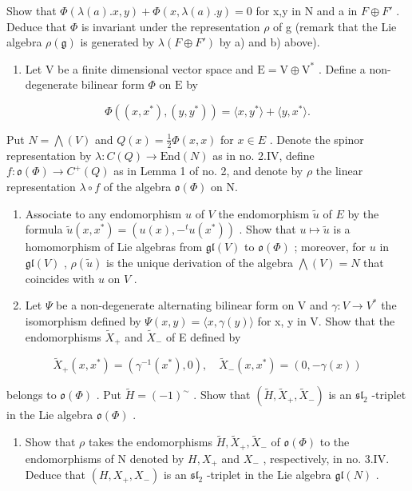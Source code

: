Show that \(\Phi(\lambda(a).x,y)+\Phi(x,\lambda(a).y)=0\) for x,y in N and a in \(F\oplus F'\) . Deduce that \(\Phi\) is invariant under the representation \(\rho\) of g (remark that the Lie algebra \(\rho(\mathfrak{g})\) is generated by \(\lambda(F\oplus F')\) by a) and b) above).

\begin{enumerate}
\def\labelenumi{\arabic{enumi})}
\setcounter{enumi}{18}
\tightlist
\item
  Let \(\mathrm{V}\) be a finite dimensional vector space and \(\mathrm{E} = \mathrm{V} \oplus \mathrm{V}^*\) . Define a non-degenerate bilinear form \(\varPhi\) on \(\mathrm{E}\) by
\end{enumerate}

\[
\Phi ((x, x ^ {*}), (y, y ^ {*})) = \langle x, y ^ {*} \rangle + \langle y, x ^ {*} \rangle .
\]

Put \(N = \bigwedge(V)\) and \(Q(x) = \frac{1}{2}\Phi(x, x)\) for \(x \in E\) . Denote the spinor representation by \(\lambda : C(Q) \to \text{End}(N)\) as in no. 2.IV, define \(f : \mathfrak{o}(\Phi) \to C^{+}(Q)\) as in Lemma 1 of no. 2, and denote by \(\rho\) the linear representation \(\lambda \circ f\) of the algebra \(\mathfrak{o}(\Phi)\) on N.

\begin{enumerate}
\def\labelenumi{\alph{enumi})}
\item
  Associate to any endomorphism \(u\) of \(V\) the endomorphism \(\tilde{u}\) of \(E\) by the formula \(\tilde{u}(x, x^{*}) = (u(x), -^{t}u(x^{*}))\) . Show that \(u \mapsto \tilde{u}\) is a homomorphism of Lie algebras from \(\mathfrak{gl}(V)\) to \(\mathfrak{o}(\varPhi)\) ; moreover, for \(u\) in \(\mathfrak{gl}(V)\) , \(\rho(\tilde{u})\) is the unique derivation of the algebra \(\bigwedge(V) = N\) that coincides with \(u\) on \(V\) .
\item
  Let \(\varPsi\) be a non-degenerate alternating bilinear form on V and \(\gamma: V \to V^{*}\) the isomorphism defined by \(\varPsi(x, y) = \langle x, \gamma(y) \rangle\) for x, y in V. Show that the endomorphisms \(\tilde{X}_{+}\) and \(\tilde{X}_{-}\) of E defined by
\end{enumerate}

\[
\tilde {X} _ {+} (x, x ^ {*}) = (\gamma^ {- 1} (x ^ {*}), 0), \quad \tilde {X} _ {-} (x, x ^ {*}) = (0, - \gamma (x))
\]

belongs to \(\mathfrak{o}(\varPhi)\) . Put \(\tilde{H} = (-1)^{\sim}\) . Show that \((\tilde{H}, \tilde{X}_{+}, \tilde{X}_{-})\) is an \(\mathfrak{sl}_2\) -triplet in the Lie algebra \(\mathfrak{o}(\varPhi)\) .

\begin{enumerate}
\def\labelenumi{\alph{enumi})}
\setcounter{enumi}{2}
\tightlist
\item
  Show that \(\rho\) takes the endomorphisms \(\tilde{H}, \tilde{X}_{+}, \tilde{X}_{-}\) of \(\mathfrak{o}(\Phi)\) to the endomorphisms of N denoted by \(H, X_{+}\) and \(X_{-}\) , respectively, in no. 3.IV. Deduce that \((H, X_{+}, X_{-})\) is an \(\mathfrak{sl}_{2}\) -triplet in the Lie algebra \(\mathfrak{gl}(N)\) .
\end{enumerate}

